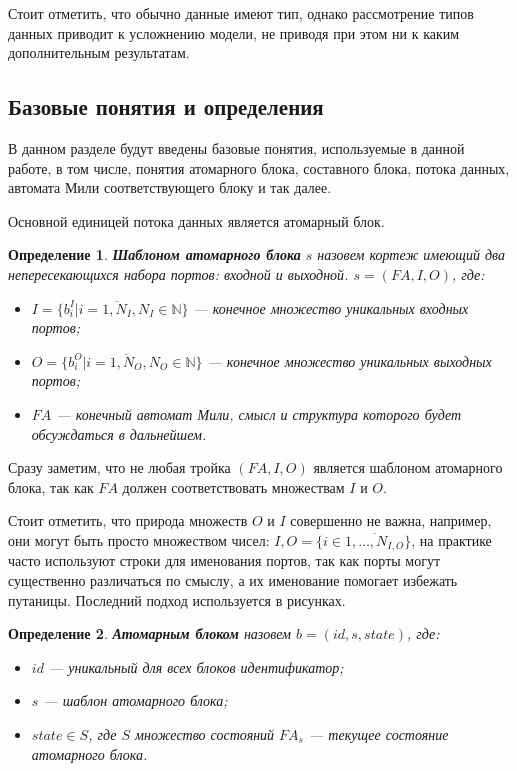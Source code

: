 \documentclass[10pt,a4paper]{article}
\newtheorem{defen}{Определение}
\newcommand{\FA}{F\!A}
\begin{document}
Стоит отметить, что обычно данные имеют тип, однако рассмотрение типов данных приводит к усложнению модели,
не приводя при этом ни к каким дополнительным результатам.

\subsection{Базовые понятия и определения}
В данном разделе будут введены базовые понятия, используемые в данной работе, в том числе,
понятия атомарного блока, составного блока, потока данных, автомата Мили соответствующего блоку и так далее.

Основной единицей потока данных является атомарный блок.
\begin{defen}
  \textbf{Шаблоном атомарного блока} $s$ назовем кортеж имеющий два непересекающихся набора портов: \textit{входной} и \textit{выходной}.
  $s = (\FA, I, O)$, где:
  \begin{itemize}
    \item $I = \{b^I_i \vert i = \overline{1, N_I}, N_I \in \mathbb{N}\}$ --- конечное множество уникальных входных портов;
    \item $O = \{b^O_i \vert i = \overline{1, N_O}, N_O \in \mathbb{N}\}$ --- конечное множество уникальных выходных портов;
    \item $\FA$ --- конечный автомат Мили, смысл и структура которого будет обсуждаться в дальнейшем.
  \end{itemize}
\end{defen}
Сразу заметим, что не любая тройка $(\FA, I, O)$ является шаблоном атомарного блока, так как $\FA$ должен
соответствовать множествам $I$ и $O$.

Стоит отметить, что природа множеств $O$ и $I$ совершенно не важна, например, они могут быть просто множеством чисел: $I, O = \{i \in \overline{1, \dots, N_{I, O}}\}$,
на практике часто используют строки для именования портов, так как порты могут существенно различаться по смыслу, а их именование помогает избежать путаницы.
Последний подход используется в рисунках.

\begin{defen}
  \textbf{Атомарным блоком} назовем $b = (id, s, state)$, где:
  \begin{itemize}
    \item $id$ --- уникальный для всех блоков идентификатор;
    \item $s$ --- шаблон атомарного блока;
    \item $state \in S$, где $S$ множество состояний $\FA_s$ --- текущее состояние атомарного блока.
  \end{itemize}
\end{defen}
\end{document}
